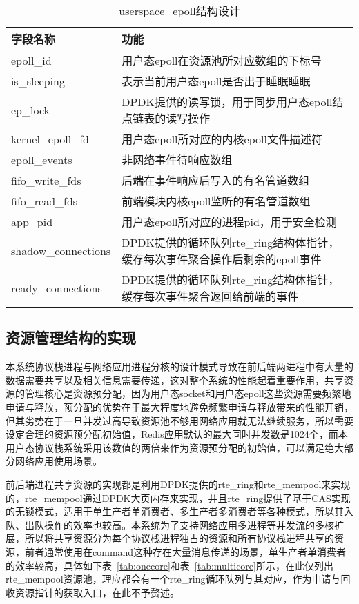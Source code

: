 \begin{table}[]
\centering
\caption{userspace\_epoll结构设计}
\label{tab:epoll}
\begin{tabular}{lp{10cm}}
\toprule[1.5pt]
\textbf{字段名称} & \textbf{功能} \\ 
\midrule[1pt]
epoll\_id & 用户态epoll在资源池所对应数组的下标号 \\
is\_sleeping & 表示当前用户态epoll是否出于睡眠睡眠 \\
ep\_lock & DPDK提供的读写锁，用于同步用户态epoll结点链表的读写操作 \\
kernel\_epoll\_fd & 用户态epoll所对应的内核epoll文件描述符 \\
epoll\_events & 非网络事件待响应数组 \\
fifo\_write\_fds & 后端在事件响应后写入的有名管道数组 \\
fifo\_read\_fds & 前端模块内核epoll监听的有名管道数组 \\
app\_pid & 用户态epoll所对应的进程pid，用于安全检测 \\
shadow\_connections & DPDK提供的循环队列rte\_ring结构体指针，缓存每次事件聚合操作后剩余的epoll事件 \\
ready\_connections & DPDK提供的循环队列rte\_ring结构体指针，缓存每次事件聚合返回给前端的事件 \\
\bottomrule[1.5pt]
\end{tabular}
\end{table}

\subsection{资源管理结构的实现}

本系统协议栈进程与网络应用进程分核的设计模式导致在前后端两进程中有大量的数据需要共享以及相关信息需要传递，这对整个系统的性能起着重要作用，共享资源的管理核心是资源预分配，因为用户态socket和用户态epoll这些资源需要频繁地申请与释放，预分配的优势在于最大程度地避免频繁申请与释放带来的性能开销，但其劣势在于一旦并发过高导致资源池不够用网络应用就无法继续服务，所以需要设定合理的资源预分配初始值，Redis应用默认的最大同时并发数是1024个，而本用户态协议栈系统采用该数值的两倍来作为资源预分配的初始值，可以满足绝大部分网络应用使用场景。

前后端进程共享资源的实现都是利用DPDK提供的rte\_ring和rte\_mempool来实现的，rte\_mempool通过DPDK大页内存来实现，并且rte\_ring提供了基于CAS实现的无锁模式，适用于单生产者单消费者、多生产者多消费者等各种模式，所以其入队、出队操作的效率也较高。本系统为了支持网络应用多进程等并发流的多核扩展，所以将共享资源分为每个协议栈进程独占的资源和所有协议栈进程共享的资源，前者通常使用在command这种存在大量消息传递的场景，单生产者单消费者的效率较高，具体如下表~\ref{tab:onecore}和表~\ref{tab:multicore}所示，在此仅列出rte\_mempool资源池，理应都会有一个rte\_ring循环队列与其对应，作为申请与回收资源指针的获取入口，在此不予赘述。

